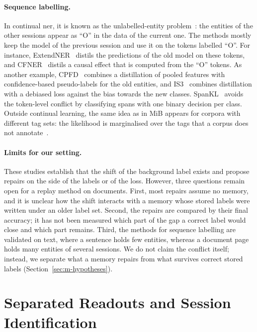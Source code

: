 \paragraph{Sequence labelling.} In continual \gls{ner}, it is known as the
unlabelled-entity problem~\citep{ma2023learning}: the entities of the other sessions appear
as ``O'' in the data of the current one. The methods mostly keep the model of the previous
session and use it on the tokens labelled ``O''. For instance,
ExtendNER~\citep{monaikul2021extendner} distils the predictions of the old model on these
tokens, and CFNER~\citep{zheng2022cfner} distils a causal effect that is computed from the
``O'' tokens. As another example, CPFD~\citep{zhang2023cpfd} combines a distillation of
pooled features with confidence-based pseudo-labels for the old entities, and
IS3~\citep{qiu2024is3} combines distillation with a debiased loss against the bias towards
the new classes. SpanKL~\citep{zhang2023spankl} avoids the token-level conflict by
classifying spans with one binary decision per class. Outside continual learning, the same
idea as in MiB appears for corpora with different tag sets: the likelihood is marginalised
over the tags that a corpus does not
annotate~\citep{greenberg2018marginal,beryozkin2019tagset}.

\paragraph{Limits for our setting.} These studies establish that the shift of the
background label exists and propose repairs on the side of the labels or of the loss.
However, three questions remain open for a replay method on documents. First, most repairs
assume no memory, and it is unclear how the shift interacts with a memory whose stored
labels were written under an older label set. Second, the repairs are compared by their
final accuracy; it has not been measured which part of the gap a correct label would close
and which part remains. Third, the methods for sequence labelling are validated on text,
where a sentence holds few entities, whereas a document page holds many entities of several
sessions. We do not claim the conflict itself; instead, we separate what a memory repairs
from what survives correct stored labels (Section~\ref{sec:m-hypotheses}).

\section{Separated Readouts and Session Identification}
\label{sec:c2-s4}

